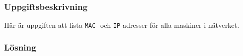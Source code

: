 \subsubsection{Uppgiftsbeskrivning}
Här är uppgiften att lista \texttt{MAC}- och \texttt{IP}-adresser för alla 
maskiner i nätverket.

\subsubsection{Lösning}


